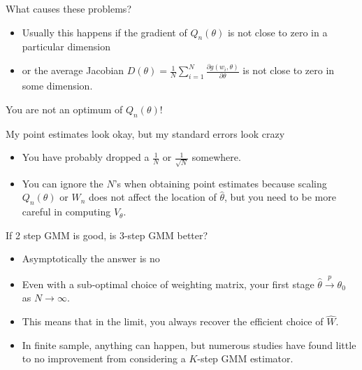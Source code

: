 \begin{frame}{What causes these problems?}
\begin{itemize}
\item Usually this happens if the gradient of $Q_n(\theta)$ is not close to zero in a particular dimension 
\item or the average Jacobian $D(\theta)=\frac{1}{N} \sum_{i=1}^N \frac{\partial g(w_i,\theta)}{\partial \theta}$ is not close to zero in some dimension.
\end{itemize}
You are not an optimum of $Q_n(\theta)$!
\end{frame}


\begin{frame}{My point estimates look okay, but my standard errors look crazy}
\begin{itemize}
\item You have probably dropped a $\frac{1}{N}$ or $\frac{1}{\sqrt{N}}$ somewhere.
\item  You can ignore the $N$'s when obtaining point estimates because scaling $Q_n(\theta)$ or $W_n$ does not affect the location of $\hat{\theta}$, but you need to be more careful in computing $V_{\theta}$.
\end{itemize}
\end{frame}

\begin{frame}{If 2 step GMM is good, is 3-step GMM better?}
\begin{itemize}
\item Asymptotically the answer is no
\item Even with a sub-optimal choice of weighting matrix, your first stage  $\hat{\theta} \overset{p}{\to}\theta_0$ as $N \rightarrow \infty$.
\item  This means that in the limit, you always recover the efficient choice of $\hat{W}$.
\item  In finite sample, anything can happen, but numerous studies have found little to no improvement from considering a $K$-step GMM estimator.
\end{itemize}
\end{frame}

